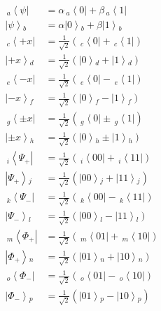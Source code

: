 \documentclass[12pt]{article}
\newcommand{\ket}[2][]{\left|#2\right\rangle\!{}_{#1}}
\newcommand{\bra}[2][]{\,{}_{#1}\!\left\langle#2\right|}
\newcommand{\qubitbra}[1][]{\alpha\bra[#1]{0} + \beta\bra[#1]{1}}
\newcommand{\qubitket}[1][]{\alpha\ket[#1]{0} + \beta\ket[#1]{1}}
\newcommand{\plusbra}[1][]{\frac{1}{\sqrt{2}}\left(\bra[#1]{0} + \bra[#1]{1}\right)}
\newcommand{\plusket}[1][]{\frac{1}{\sqrt{2}}\left(\ket[#1]{0} + \ket[#1]{1}\right)}
\newcommand{\minusbra}[1][]{\frac{1}{\sqrt{2}}\left(\bra[#1]{0} - \bra[#1]{1}\right)}
\newcommand{\minusket}[1][]{\frac{1}{\sqrt{2}}\left(\ket[#1]{0} - \ket[#1]{1}\right)}
\newcommand{\pmbra}[1][]{\frac{1}{\sqrt{2}}\left(\bra[#1]{0} \pm \bra[#1]{1}\right)}
\newcommand{\pmket}[1][]{\frac{1}{\sqrt{2}}\left(\ket[#1]{0} \pm \ket[#1]{1}\right)}
\newcommand{\psiplusbra}[1][]{\frac{1}{\sqrt{2}}\left(\bra[#1]{00} + \bra[#1]{11}\right)}
\newcommand{\psiplusket}[1][]{\frac{1}{\sqrt{2}}\left(\ket[#1]{00} + \ket[#1]{11}\right)}
\newcommand{\psiminusbra}[1][]{\frac{1}{\sqrt{2}}\left(\bra[#1]{00} - \bra[#1]{11}\right)}
\newcommand{\psiminusket}[1][]{\frac{1}{\sqrt{2}}\left(\ket[#1]{00} - \ket[#1]{11}\right)}
\newcommand{\phiplusbra}[1][]{\frac{1}{\sqrt{2}}\left(\bra[#1]{01} + \bra[#1]{10}\right)}
\newcommand{\phiplusket}[1][]{\frac{1}{\sqrt{2}}\left(\ket[#1]{01} + \ket[#1]{10}\right)}
\newcommand{\phiminusbra}[1][]{\frac{1}{\sqrt{2}}\left(\bra[#1]{01} - \bra[#1]{10}\right)}
\newcommand{\phiminusket}[1][]{\frac{1}{\sqrt{2}}\left(\ket[#1]{01} - \ket[#1]{10}\right)}
\begin{document}
\begin{align*}
\bra[a]{\psi} &= \qubitbra[a] \\
\ket[b]{\psi} &= \qubitket[b] \\
\bra[c]{+x} &= \plusbra[c] \\
\ket[d]{+x} &= \plusket[d] \\
\bra[e]{-x} &= \minusbra[e] \\
\ket[f]{-x} &= \minusket[f] \\
\bra[g]{\pm x} &= \pmbra[g] \\
\ket[h]{\pm x} &= \pmket[h] \\
\bra[i]{\Psi_+} &= \psiplusbra[i] \\
\ket[j]{\Psi_+} &= \psiplusket[j] \\
\bra[k]{\Psi_-} &= \psiminusbra[k] \\
\ket[l]{\Psi_-} &= \psiminusket[l] \\
\bra[m]{\Phi_+} &= \phiplusbra[m] \\
\ket[n]{\Phi_+} &= \phiplusket[n] \\
\bra[o]{\Phi_-} &= \phiminusbra[o] \\
\ket[p]{\Phi_-} &= \phiminusket[p] \\
\end{align*}
\end{document}
